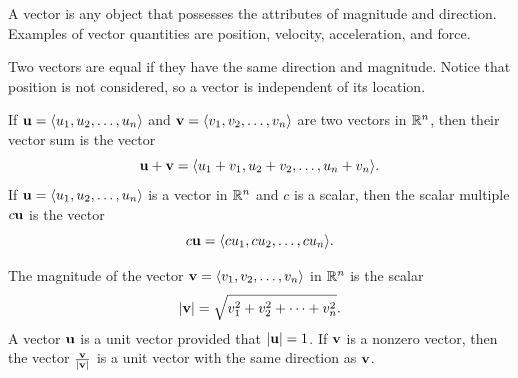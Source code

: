 





%


\begin{summary}
\item A vector is any object that possesses the attributes of
  magnitude and direction. Examples of vector quantities are position,
  velocity, acceleration, and force.  
\item Two vectors are equal if they have the
  same direction and magnitude. Notice that position is not considered, so a vector is independent of its location.
\item If $\mathbf{u} = \langle u_1, u_2, \ldots, u_n \rangle$ and $\mathbf{v} =
  \langle v_1, v_2, \ldots, v_n \rangle$ are two vectors in $\mathbb{R}^n$,
  then their vector sum is the vector
\[\mathbf{u} + \mathbf{v} = \langle u_1+v_1, u_2+v_2, \ldots, u_n+v_n \rangle.\]
If $\mathbf{u} = \langle u_1, u_2, \ldots, u_n \rangle$ is a vector in $\mathbb{R}^n$
and $c$ is a scalar, then the scalar multiple $c\mathbf{u}$ is the vector
 \[c\mathbf{u} = \langle cu_1, cu_2, \ldots, cu_n \rangle.\]
\item The magnitude of the vector $\mathbf{v} = \langle v_1, v_2, \ldots, v_n
  \rangle$ in $\mathbb{R}^n$ is the scalar
  \[|\mathbf{v}| = \sqrt{v_1^2+v_2^2+ \cdots + v_n^2}.\] A vector $\mathbf{u}$ is a
  unit vector provided that $|\mathbf{u}| = 1$. If $\mathbf{v}$ is a nonzero vector,
  then the vector $\frac{\mathbf{v}}{|\mathbf{v}|}$ is a unit vector with the same
  direction as $\mathbf{v}$.
\end{summary}

\nin \hrulefill



\clearpage
